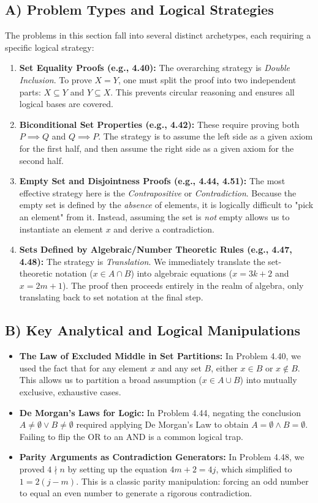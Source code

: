 \documentclass[11pt]{article}
\theoremstyle{definition}
\theoremstyle{remark}
\begin{document}
\subsection{A) Problem Types and Logical Strategies}
The problems in this section fall into several distinct archetypes, each requiring a specific logical strategy:
\begin{enumerate}
    \item \textbf{Set Equality Proofs (e.g., 4.40):} The overarching strategy is \textit{Double Inclusion}. To prove $X = Y$, one must split the proof into two independent parts: $X \subseteq Y$ and $Y \subseteq X$. This prevents circular reasoning and ensures all logical bases are covered.
    \item \textbf{Biconditional Set Properties (e.g., 4.42):} These require proving both $P \implies Q$ and $Q \implies P$. The strategy is to assume the left side as a given axiom for the first half, and then assume the right side as a given axiom for the second half.
    \item \textbf{Empty Set and Disjointness Proofs (e.g., 4.44, 4.51):} The most effective strategy here is the \textit{Contrapositive} or \textit{Contradiction}. Because the empty set is defined by the \textit{absence} of elements, it is logically difficult to "pick an element" from it. Instead, assuming the set is \textit{not} empty allows us to instantiate an element $x$ and derive a contradiction.
    \item \textbf{Sets Defined by Algebraic/Number Theoretic Rules (e.g., 4.47, 4.48):} The strategy is \textit{Translation}. We immediately translate the set-theoretic notation ($x \in A \cap B$) into algebraic equations ($x = 3k + 2$ and $x = 2m + 1$). The proof then proceeds entirely in the realm of algebra, only translating back to set notation at the final step.
\end{enumerate}

\subsection{B) Key Analytical and Logical Manipulations}
\begin{itemize}
    \item \textbf{The Law of Excluded Middle in Set Partitions:} In Problem 4.40, we used the fact that for any element $x$ and any set $B$, either $x \in B$ or $x \notin B$. This allows us to partition a broad assumption ($x \in A \cup B$) into mutually exclusive, exhaustive cases.
    \item \textbf{De Morgan's Laws for Logic:} In Problem 4.44, negating the conclusion $A \neq \emptyset \lor B \neq \emptyset$ required applying De Morgan's Law to obtain $A = \emptyset \land B = \emptyset$. Failing to flip the OR to an AND is a common logical trap.
    \item \textbf{Parity Arguments as Contradiction Generators:} In Problem 4.48, we proved $4 \nmid n$ by setting up the equation $4m + 2 = 4j$, which simplified to $1 = 2(j - m)$. This is a classic parity manipulation: forcing an odd number to equal an even number to generate a rigorous contradiction.
\end{itemize}
\end{document}
